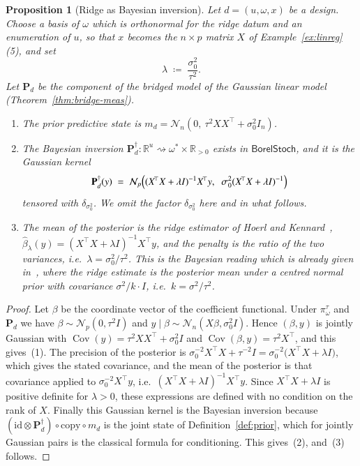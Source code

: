 \documentclass[11pt,a4paper]{article}
\theoremstyle{plain}
\newtheorem{proposition}[theorem]{Proposition}
\theoremstyle{definition}
\theoremstyle{remark}
\newcommand{\cat}[1]{\mathsf{#1}}
\newcommand{\id}{\mathrm{id}}
\newcommand{\R}{\mathbb{R}}
\newcommand{\Norm}{\mathcal{N}}
\newcommand{\BorelStoch}{\cat{BorelStoch}}
\begin{document}
\begin{proposition}[Ridge as Bayesian inversion]\label{prop:ridge}
Let $d = (u,\omega,x)$ be a design. Choose a basis of $\omega$ which is
orthonormal for the ridge datum and an enumeration of $u$, so that $x$ becomes
the $n \times p$ matrix $X$ of Example~\ref{ex:linreg}(5), and set
\[
\lambda \;\coloneqq\; \frac{\sigma_{0}^{2}}{\tau^{2}} .
\]
Let $\mathbf{P}_{d}$ be the component of the bridged model of the Gaussian
linear model (Theorem~\ref{thm:bridge-meas}).
\begin{enumerate}
\item The prior predictive state is
$m_{d} = \Norm_{n}(0,\ \tau^{2} X X^{\!\top} + \sigma_{0}^{2} I_{n})$.
\item The Bayesian inversion
$\mathbf{P}_{d}^{\dagger} \colon \R^{u} \rightsquigarrow
\omega^{*}\times\R_{>0}$ exists in $\BorelStoch$, and it is the Gaussian kernel
\[
\mathbf{P}_{d}^{\dagger}(y)
\;=\;
\Norm_{p}\Bigl(
(X^{\!\top}X + \lambda I)^{-1} X^{\!\top} y,
\;\;
\sigma_{0}^{2}(X^{\!\top}X + \lambda I)^{-1}
\Bigr)
\]
tensored with $\delta_{\sigma_{0}^{2}}$. We omit the factor
$\delta_{\sigma_{0}^{2}}$ here and in what follows.
\item The mean of the posterior is the ridge estimator of Hoerl and
Kennard~\cite[eq.~(2.1), p.~57]{hoerl_ridge_1970},
$\widehat{\beta}_{\lambda}(y) = (X^{\!\top}X + \lambda I)^{-1} X^{\!\top} y$,
and the penalty is the ratio of the two variances, i.e.\
$\lambda = \sigma_{0}^{2}/\tau^{2}$. This is the Bayesian reading which is
already given in~\cite[\S6, p.~64]{hoerl_ridge_1970}, where the ridge estimate
is the posterior mean under a centred normal prior with covariance
$\sigma^{2}/k\cdot I$, i.e.\ $k = \sigma^{2}/\tau^{2}$.
\end{enumerate}
\end{proposition}

\begin{proof}
Let $\beta$ be the coordinate vector of the coefficient functional. Under
$\pi^{\tau}_{\omega}$ and $\mathbf{P}_{d}$ we have
$\beta \sim \Norm_{p}(0,\tau^{2}I)$ and
$y \mid \beta \sim \Norm_{n}(X\beta, \sigma_{0}^{2}I)$. Hence $(\beta,y)$ is
jointly Gaussian with
$\operatorname{Cov}(y) = \tau^{2}XX^{\!\top} + \sigma_{0}^{2}I$ and
$\operatorname{Cov}(\beta,y) = \tau^{2}X^{\!\top}$, and this gives~(1). The
precision of the posterior is
$\sigma_{0}^{-2}X^{\!\top}X + \tau^{-2}I
= \sigma_{0}^{-2}\bigl(X^{\!\top}X + \lambda I\bigr)$, which gives the stated
covariance, and the mean of the posterior is that covariance applied to
$\sigma_{0}^{-2}X^{\!\top}y$, i.e.\
$(X^{\!\top}X+\lambda I)^{-1}X^{\!\top}y$. Since $X^{\!\top}X + \lambda I$ is
positive definite for $\lambda>0$, these expressions are defined with no
condition on the rank of $X$. Finally this Gaussian kernel is the Bayesian
inversion because
$(\id \otimes \mathbf{P}_{d}^{\dagger}) \circ \mathrm{copy} \circ m_{d}$ is the
joint state of Definition~\ref{def:prior}, which for jointly Gaussian pairs is
the classical formula for conditioning. This gives~(2), and~(3) follows.
\end{proof}
\end{document}
